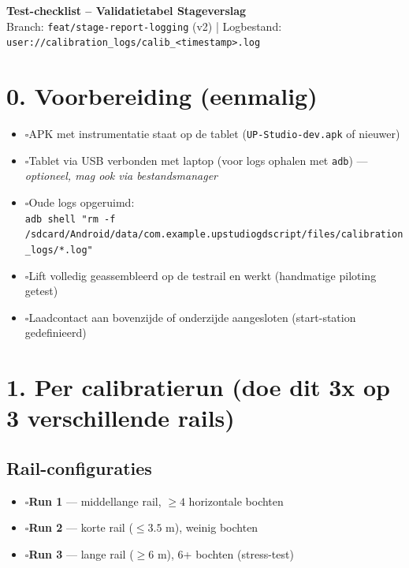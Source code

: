 \documentclass[a4paper,11pt]{article}
\newcommand{\cbox}{$\square$\hspace{0.5em}}
\begin{document}
\begin{center}
    {\Large\bfseries Test-checklist -- Validatietabel Stageverslag}\\[0.3em]
    {\small Branch: \texttt{feat/stage-report-logging} (v2) \hspace{1em}|\hspace{1em}
     Logbestand: \texttt{user://calibration\_logs/calib\_<timestamp>.log}}
\end{center}

\vspace{0.5em}

\section*{0. Voorbereiding (eenmalig)}
\begin{itemize}
    \item \cbox APK met instrumentatie staat op de tablet (\texttt{UP-Studio-dev.apk} of nieuwer)
    \item \cbox Tablet via USB verbonden met laptop (voor logs ophalen met \texttt{adb}) --- \textit{optioneel, mag ook via bestandsmanager}
    \item \cbox Oude logs opgeruimd: \\
        \texttt{\small adb shell "rm -f /sdcard/Android/data/com.example.upstudiogdscript/files/calibration\_logs/*.log"}
    \item \cbox Lift volledig geassembleerd op de testrail en werkt (handmatige piloting getest)
    \item \cbox Laadcontact aan bovenzijde of onderzijde aangesloten (start-station gedefinieerd)
\end{itemize}

\section*{1. Per calibratierun (doe dit 3x op 3 verschillende rails)}

\subsection*{Rail-configuraties}
\begin{itemize}
    \item \cbox \textbf{Run 1} --- middellange rail, $\geq 4$ horizontale bochten
    \item \cbox \textbf{Run 2} --- korte rail ($\leq 3.5$ m), weinig bochten
    \item \cbox \textbf{Run 3} --- lange rail ($\geq 6$ m), 6+ bochten (stress-test)
\end{itemize}
\end{document}
